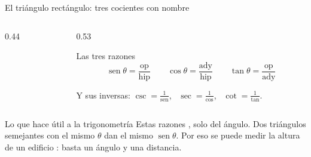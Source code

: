 \documentclass[aspectratio=169,10pt]{beamer}
\begin{document}
\begin{frame}{El triángulo rectángulo: tres cocientes con nombre}
  \scriptsize
  \begin{columns}[T,onlytextwidth]
    \begin{column}{0.44\textwidth}
      \vspace{0.15cm}
      \begin{center}
      \end{center}
    \end{column}
    \begin{column}{0.53\textwidth}
      \begin{block}{Las tres razones}
        \tiny
        \[ \operatorname{sen}\theta = \frac{\text{op}}{\text{hip}}
           \qquad
           \cos\theta = \frac{\text{ady}}{\text{hip}}
           \qquad
           \tan\theta = \frac{\text{op}}{\text{ady}} \]
        \vspace{-0.1cm}
        \begin{center}
        \end{center}
        Y sus inversas: $\csc=\frac{1}{\operatorname{sen}}$, \
        $\sec=\frac{1}{\cos}$, \ $\cot=\frac{1}{\tan}$.
      \end{block}
    \end{column}
  \end{columns}

  \vspace{0.1cm}
  \begin{alertblock}{Lo que hace útil a la trigonometría}
    \tiny
    Estas razones , solo del
    ángulo. Dos triángulos semejantes con el mismo $\theta$ dan el mismo
    $\operatorname{sen}\theta$. Por eso se puede medir la altura de un edificio
    \azul{sin subirse a él}: basta un ángulo y una distancia.
  \end{alertblock}
\end{frame}
\end{document}
